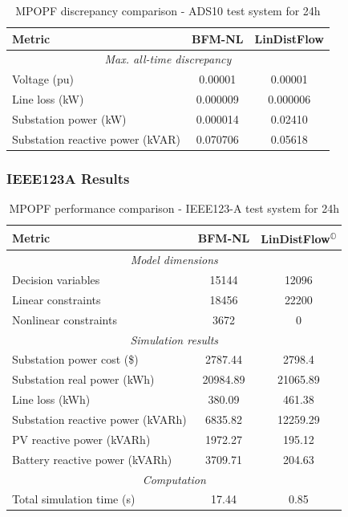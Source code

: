 \begin{table}[H]
    \centering
    \caption{MPOPF discrepancy comparison - ADS10 test system for 24h}
    \label{table:mpopf-tradeoffs-feas-ads10}
    \begin{tabular}{|l|c|c|}
    \hline
    \textbf{Metric} & \textbf{BFM-NL} & \textbf{LinDistFlow} \\ \hline
    \multicolumn{3}{|c|}{\textit{Max. all-time discrepancy}} \\ \hline
    Voltage (pu) & 0.00001 & 0.00001 \\ \hline
    Line loss (kW) & 0.000009 & 0.000006 \\ \hline
    Substation power (kW) & 0.000014 & 0.02410 \\ \hline
    Substation reactive power (kVAR) & 0.070706 & 0.05618 \\ \hline
    \end{tabular}
\end{table}

\subsubsection{IEEE123A Results}

\begin{table}[H]
    \centering
    \caption{MPOPF performance comparison - IEEE123-A test system for 24h}
    \label{table:mpopf-tradeoffs-opt-ieee123a}
    \begin{tabular}{|l|c|c|}
    \hline
    \textbf{Metric} & \textbf{BFM-NL} & \textbf{LinDistFlow\textsuperscript{\(\mathbb{O}\)}} \\ \hline
    \multicolumn{3}{|c|}{\textit{Model dimensions}} \\ \hline
    Decision variables & {15144} & {12096} \\ \hline
    Linear constraints & {18456} & {22200} \\ \hline
    Nonlinear constraints & {3672} & {0} \\ \hline
    \multicolumn{3}{|c|}{\textit{Simulation results}} \\ \hline
    Substation power cost (\$) & 2787.44 & 2798.4 \\ \hline
    Substation real power (kWh) & 20984.89 & 21065.89 \\ \hline
    Line loss (kWh) & 380.09 & 461.38 \\ \hline
    Substation reactive power (kVARh) & 6835.82 & 12259.29 \\ \hline
    PV reactive power (kVARh) & 1972.27 & 195.12 \\ \hline
    Battery reactive power (kVARh) & 3709.71 & 204.63 \\ \hline
    \multicolumn{3}{|c|}{\textit{Computation}} \\ \hline
    Total simulation time (s) & 17.44 & 0.85 \\ \hline
    \end{tabular}
\end{table}

